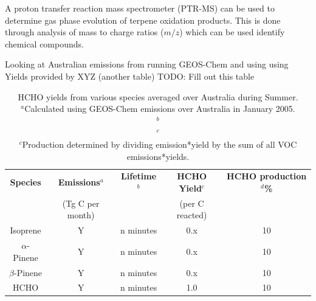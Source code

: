     A proton transfer reaction mass spectrometer (PTR-MS) can be used to determine gas phase evolution of terpene oxidation products.
    This is done through analysis of mass to charge ratios ($m/z$) which can be used identify chemical compounds.
    
    Looking at Australian emissions from running GEOS-Chem and using using Yields provided by XYZ (another table)
    TODO: Fill out this table
    \begin{table}
    \begin{tabular}{ | c  c  c  c  c | }
      \hline
      \textbf{Species} & \textbf{Emissions$^a$} & \textbf{Lifetime$^b$} & \textbf{HCHO Yield$^c$} & \textbf{HCHO production$^d$\%}
      \\ & (Tg C per month) & & (per C reacted) &
      \\ \hline
      Isoprene & Y & n minutes & 0.x & 10
      \\
      $\alpha$-Pinene & Y & n minutes & 0.x & 10
      \\ %
      $\beta$-Pinene & Y & n minutes & 0.x & 10
      \\
      HCHO & Y & n minutes & 1.0 & 10
      \\ \hline
    \end{tabular}
    \caption{HCHO yields from various species averaged over Australia during Summer. \hspace{\textwidth} \\ 
    ${}^a$Calculated using GEOS-Chem emissions over Australia in January 2005. \hspace{\textwidth} \\ 
    ${}^b$ \hspace{\textwidth} \\ 
    ${}^c$ \hspace{\textwidth} \\ 
    ${}^c$Production determined by dividing emission*yield by the sum of all VOC emissions*yields. \hspace{\textwidth} \\ 
    }
    \label{ch_isop:tab:VOCAusYields}
    \end{table}
    
    

